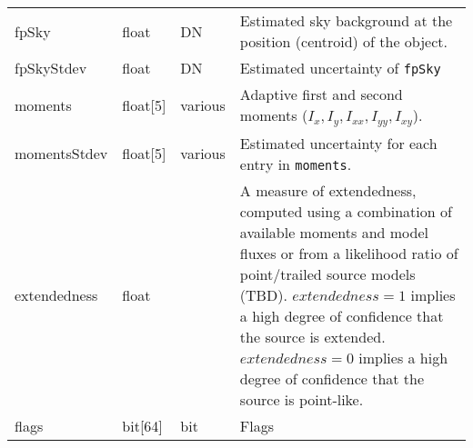 \documentclass[12pt]{article}
\begin{document}
\begin{center}
\begin{longtable}{p{3cm}p{2cm}p{2cm}p{5cm}}
fpSky & float & DN & Estimated sky background at the position (centroid) of the object. \\ 

fpSkyStdev & float & DN & Estimated uncertainty of \texttt{fpSky} \\ 



moments & float[5] & various & Adaptive first and second moments ($I_{x}, I_{y}, I_{xx}, I_{yy}, I_{xy}$). \\ 

momentsStdev & float[5] & various & Estimated uncertainty for each entry in \texttt{moments}. \\ 

extendedness & float & ~ & A measure of extendedness, computed using a combination of available moments and model fluxes or from a likelihood ratio of point/trailed source models (TBD). $extendedness=1$ implies a high degree of confidence that the source is extended. $extendedness=0$ implies a high degree of confidence that the source is point-like. \\

flags & bit[64] & bit & Flags \\ \hline
\end{longtable}
\end{center}
\end{document}
